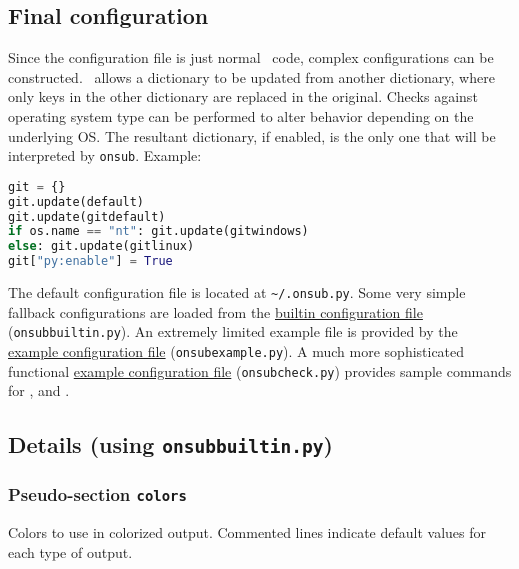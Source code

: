 \subsection{Final configuration}
Since the configuration file is just normal \Python\ code, complex configurations can be constructed. \Python\ allows a dictionary to be updated from another dictionary, where only keys in the other dictionary are replaced in the original. Checks against operating system type can be performed to alter behavior depending on the underlying OS. The resultant dictionary, if enabled, is the only one that will be interpreted by \lstinline{onsub}. Example:

\begin{snugshade}
\begin{lstlisting}[language=python]
git = {}
git.update(default)
git.update(gitdefault)
if os.name == "nt": git.update(gitwindows)
else: git.update(gitlinux)
git["py:enable"] = True
\end{lstlisting}
\end{snugshade}

The default configuration file is located at \lstinline{~/.onsub.py}. Some very simple fallback configurations are loaded from the \href{https://bitbucket.org/sawolford/onsub/src/master/config/onsubbuiltin.py}{builtin configuration file} (\lstinline{onsubbuiltin.py}). An extremely limited example file is provided by the \href{https://bitbucket.org/sawolford/onsub/src/master/config/onsubexample.py}{example configuration file}  (\lstinline{onsubexample.py}). A much more sophisticated functional \href{https://bitbucket.org/sawolford/onsub/src/master/config/onsubcheck.py}{example configuration file} (\lstinline{onsubcheck.py}) provides sample commands for \href{https://git-scm.com/}{\Git}, \href{https://www.mercurial-scm.org/}{\Mercurial} and \href{https://subversion.apache.org/}{\Subversion}.

\subsection{Details (using \lstinline{onsubbuiltin.py})}

\subsubsection{Pseudo-section \lstinline{colors}}

Colors to use in colorized output. Commented lines indicate default values for each type of output.

